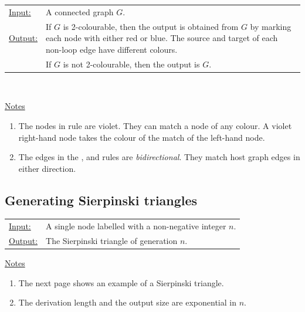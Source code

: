 \begin{tabular}{lp{10.5cm}}
\ul{Input:} & A connected graph $G$. \\
\ul{Output:} & If $G$\/ is 2-colourable, then the output is obtained from $G$\/ by marking each node with either red or blue. The source and target of each non-loop edge have different colours.\\
& If $G$\/ is not 2-colourable, then the output is $G$.
\end{tabular}

\vspace{10pt}
 \\
\vspace{10pt}

\ul{Notes}
\begin{enumerate}
\setlength{\itemsep}{-.5ex}
\item The nodes in rule  are violet. They can match a node of any colour. A violet right-hand node takes the colour of the match of the left-hand node.
\item The edges in the ,  and  rules are \emph{bidirectional}. They match host graph edges in either direction.
\end{enumerate}


\subsection{Generating Sierpinski triangles}

\begin{tabular}{lp{10.5cm}}
\ul{Input:} & A single node labelled with a non-negative integer $n$. \\
\ul{Output:} & The Sierpinski triangle of generation $n$.
\end{tabular}
  
\begin{center}

\end{center}

\ul{Notes}
\begin{enumerate}
\setlength{\itemsep}{-.5ex}
\item The next page shows an example of a Sierpinski triangle.
\item The derivation length and the output size are exponential in $n$.
\end{enumerate}

